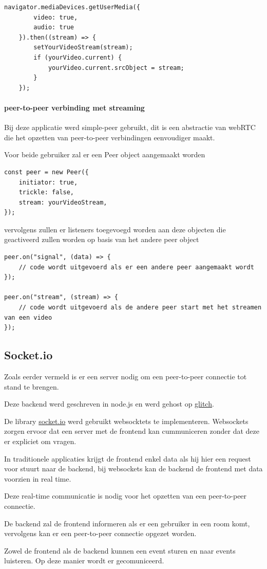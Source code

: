 \begin{lstlisting}
navigator.mediaDevices.getUserMedia({ 
		video: true,
		audio: true 
	}).then((stream) => {
		setYourVideoStream(stream);
		if (yourVideo.current) {
			yourVideo.current.srcObject = stream;
		}
	});
\end{lstlisting}


		\paragraph{peer-to-peer verbinding met streaming}
			Bij deze applicatie werd simple-peer gebruikt, dit is een abstractie van webRTC die het opzetten van peer-to-peer verbindingen eenvoudiger maakt.
			
			Voor beide gebruiker zal er een Peer object aangemaakt worden

\begin{lstlisting}
const peer = new Peer({
	initiator: true,
	trickle: false,
	stream: yourVideoStream,
});
\end{lstlisting}
			
			vervolgens zullen er listeners toegevoegd worden aan deze objecten die geactiveerd zullen worden op basis van het andere peer object
			
\begin{lstlisting}
peer.on("signal", (data) => {
	// code wordt uitgevoerd als er een andere peer aangemaakt wordt
});

peer.on("stream", (stream) => {
	// code wordt uitgevoerd als de andere peer start met het streamen van een video
});
\end{lstlisting}

	\subsection{Socket.io}
	
	
		Zoals eerder vermeld is er een server nodig om een peer-to-peer connectie tot stand te brengen.
		
		Deze backend werd geschreven in node.js en werd gehost op \href{https://glitch.com/}{glitch}.
		
		De library \href{https://socket.io/}{socket.io} werd gebruikt websocktets te implementeren. Websockets zorgen ervoor dat een server met de frontend kan cummuniceren zonder dat deze er expliciet om vragen. 
		
		In traditionele applicaties krijgt de frontend enkel data als hij hier een request voor stuurt naar de backend, bij websockets kan de backend de frontend met data voorzien in real time.
		
		Deze real-time communicatie is nodig voor het opzetten van een peer-to-peer connectie.
		
		De backend zal de frontend informeren als er een gebruiker in een room komt, vervolgens kan er een peer-to-peer connectie opgezet worden.
		
		Zowel de frontend als de backend kunnen een event sturen en naar events luisteren. Op deze manier wordt er gecomuniceerd. 		